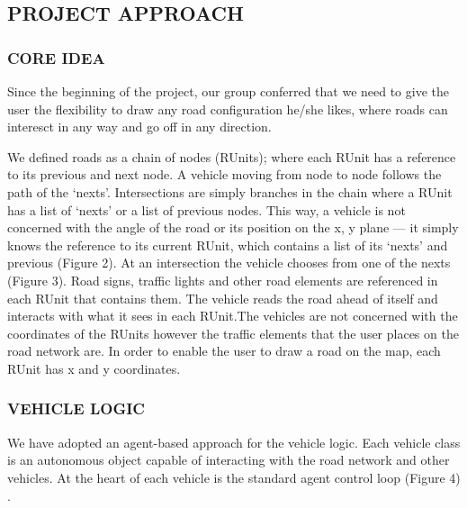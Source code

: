 \documentclass[11pt,a4paper]{article}
\begin{document}
 \subsection{PROJECT APPROACH}	
  \subsubsection{CORE IDEA}
  	Since the beginning of the project, our group conferred that we
  	need to give the user the flexibility to draw any road
  	configuration he/she likes, where roads can interesct in any way
  	and go off in any direction. 
	
  	\setlength{\parindent}{0cm}
  	We defined roads as a chain of nodes (RUnits); where each RUnit has
  	a reference to its previous and next node. A vehicle moving from
  	node to node follows the path of the ‘nexts'. Intersections are simply branches in the chain where a RUnit has a
  	list of ‘nexts’ or a list of previous nodes. This way, a vehicle is
  	not concerned with the angle of the road or its position on the x,
  	y plane --- it simply knows the reference to its current RUnit, which
  	contains a list of its ‘nexts’ and previous (Figure 2). At an
  	intersection the vehicle chooses from one of the nexts (Figure 3).
  	Road signs, traffic lights and other road elements are referenced
  	in each RUnit that contains them. The vehicle reads the road ahead
  	of itself and interacts with what it sees in each RUnit.The vehicles are not concerned with the coordinates of the RUnits
	however the traffic elements that the user places on the road
	network are. In order to enable the user to draw a road on the map,
	each RUnit has x and y coordinates.
  	
  		\begin{figure}[!h]
           \begin{floatrow}
           \end{floatrow}
        \end{figure}
          	 
    \setlength{\parindent}{0cm}\bigskip
	 
	
	\subsubsection{VEHICLE LOGIC}
  	We have adopted an agent-based approach for the vehicle logic. Each
  	vehicle class is an autonomous object capable of interacting with
  	the road network and other vehicles. At the heart of each vehicle
  	is the standard agent control loop (Figure 4) \cite{agentControl}.
	
\end{document}
